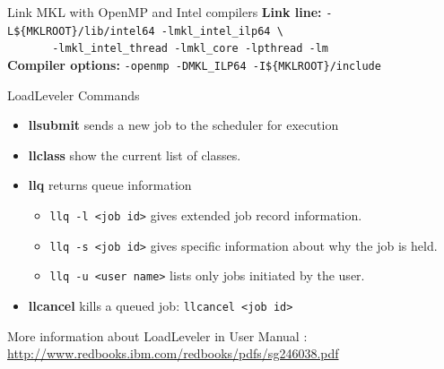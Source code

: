 \documentclass[final,t]{beamer}
\begin{document}
\begin{frame}[fragile]{}
\begin{columns}[t]
\begin{column}{.32\linewidth}
 
      \begin{block}{Link MKL with OpenMP and Intel compilers}
      \textbf{Link line:} \verb|-L${MKLROOT}/lib/intel64 -lmkl_intel_ilp64 \|\\
      \verb|       -lmkl_intel_thread -lmkl_core -lpthread -lm|\\
      \textbf{Compiler options: } \verb|-openmp -DMKL_ILP64 -I${MKLROOT}/include|
      \end{block}
 
      \begin{block}{LoadLeveler Commands}
        \begin{itemize}
        \item  \textbf{llsubmit} sends a new job to the scheduler for execution
        \item  \textbf{llclass} show the current list of classes.
        \item  \textbf{llq} returns queue information 
         \begin{itemize}
              \item \verb|llq -l <job id>| gives extended job record information.
              \item \verb|llq -s <job id>| gives specific information about why the job is held.
              \item \verb|llq -u <user name>| lists only jobs initiated by the user.
         \end{itemize}
        \item \textbf{llcancel} kills a queued job: \verb|llcancel <job id>|
        \end{itemize}
       More information about LoadLeveler in User Manual : \url{http://www.redbooks.ibm.com/redbooks/pdfs/sg246038.pdf}
      \end{block}


\end{column}
\end{columns}
\end{frame}
\end{document}
